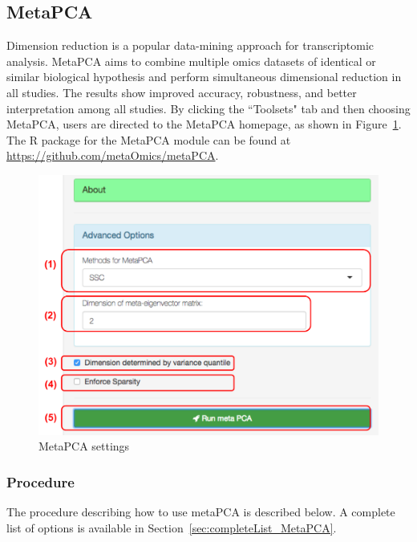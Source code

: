 \subsection{MetaPCA}
Dimension reduction is a popular data-mining approach for transcriptomic analysis.
MetaPCA aims to combine multiple omics datasets of identical or similar biological hypothesis and perform simultaneous dimensional reduction in all studies.
The results show improved accuracy, robustness, and better interpretation among all studies.
By clicking the ``Toolsets" tab and then choosing MetaPCA,
users are directed to the MetaPCA homepage, as shown in Figure~\ref{fig:metaPCAHome}.
The R package for the MetaPCA module can be found at \url{https://github.com/metaOmics/metaPCA}.

\begin{figure}[H]
\begin{center}
\includegraphics[scale=0.4]{./figure/metaPCA/metaPCAHome.pdf}
\caption{MetaPCA settings}
\label{fig:metaPCAHome}
\end{center}
\end{figure}

\subsubsection{Procedure}

The procedure describing how to use metaPCA is described below.
A complete list of options is available in Section~\ref{sec:completeList_MetaPCA}.

